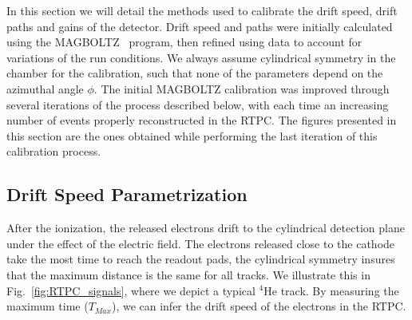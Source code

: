 \documentclass[preprint,5p]{elsarticle}
\begin{document}
In this section we will detail the methods used to calibrate the drift speed,
drift paths and gains of the detector. Drift speed and paths were initially
calculated using the MAGBOLTZ~\cite{MAGBOLTZ} program, then refined using
data to account for variations of the run conditions. We always assume 
cylindrical symmetry in the chamber for the calibration, such that none of
the parameters depend on the azimuthal angle $\phi$. The initial MAGBOLTZ
calibration was improved through several iterations of the
process described below, with each time an increasing number of events 
properly reconstructed in the RTPC. The figures presented in this section
are the ones obtained while performing the last iteration of this
calibration process.

\subsection{Drift Speed Parametrization}

After the ionization, the released electrons 
drift to the cylindrical detection plane under the effect of the electric field. The 
electrons released close to the cathode take the most time to reach the readout 
pads, the cylindrical symmetry insures that the maximum distance is the same for all 
tracks. We illustrate this in Fig.~\ref{fig:RTPC_signals}, where we depict a 
typical $^{4}$He track. By measuring the maximum time ($T_{Max}$), we can infer the drift 
speed of the electrons in the RTPC.\\
\end{document}
